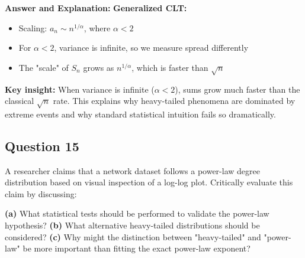 \documentclass[11pt]{article}
\newenvironment{answer}{\color{answercolor}\begin{framed}\textbf{Answer and Explanation:}}{\end{framed}}
\begin{document}
\begin{answer}
\textbf{Generalized CLT:}
\begin{itemize}
    \item Scaling: $a_n \sim n^{1/\alpha}$, where $\alpha < 2$
    \item For $\alpha < 2$, variance is infinite, so we measure spread differently
    \item The "scale" of $S_n$ grows as $n^{1/\alpha}$, which is faster than $\sqrt{n}$
\end{itemize}

\textbf{Key insight:} When variance is infinite ($\alpha < 2$), sums grow much faster than the classical $\sqrt{n}$ rate. This explains why heavy-tailed phenomena are dominated by extreme events and why standard statistical intuition fails so dramatically.
\end{answer}

\subsection{Question 15}
A researcher claims that a network dataset follows a power-law degree distribution based on visual inspection of a log-log plot. Critically evaluate this claim by discussing:

\textbf{(a)} What statistical tests should be performed to validate the power-law hypothesis?
\textbf{(b)} What alternative heavy-tailed distributions should be considered?
\textbf{(c)} Why might the distinction between "heavy-tailed" and "power-law" be more important than fitting the exact power-law exponent?
\end{document}
